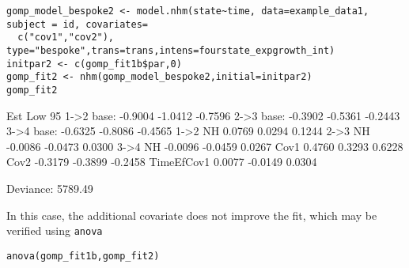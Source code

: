 \documentclass{article}
\numberwithin{equation}{section}
\begin{document}
\begin{verbatim}
gomp_model_bespoke2 <- model.nhm(state~time, data=example_data1, subject = id, covariates=
  c("cov1","cov2"), type="bespoke",trans=trans,intens=fourstate_expgrowth_int)
initpar2 <- c(gomp_fit1b$par,0)
gomp_fit2 <- nhm(gomp_model_bespoke2,initial=initpar2)
gomp_fit2
\end{verbatim}
\begin{verbout}
               Est Low 95%
1->2 base: -0.9004 -1.0412 -0.7596
2->3 base: -0.3902 -0.5361 -0.2443
3->4 base: -0.6325 -0.8086 -0.4565
1->2 NH     0.0769  0.0294  0.1244
2->3 NH    -0.0086 -0.0473  0.0300
3->4 NH    -0.0096 -0.0459  0.0267
Cov1        0.4760  0.3293  0.6228
Cov2       -0.3179 -0.3899 -0.2458
TimeEfCov1  0.0077 -0.0149  0.0304

Deviance: 5789.49
\end{verbout}
In this case, the additional covariate does not improve the fit, which may be verified using \verb!anova!
\begin{verbatim}
anova(gomp_fit1b,gomp_fit2)
\end{verbatim}
\end{document}
